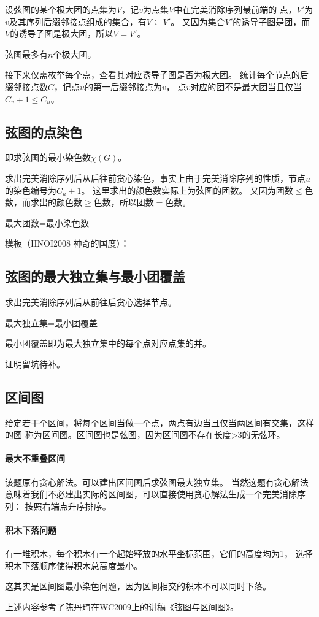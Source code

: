 设弦图的某个极大团的点集为$V$，记$v$为点集$V$中在完美消除序列最前端的
点，$V'$为$v$及其序列后缀邻接点组成的集合，有$V\subseteq V'$。
又因为集合$V'$的诱导子图是团，而$V$的诱导子图是极大团，所以$V=V'$。
\begin{inference}
    弦图最多有$n$个极大团。
\end{inference}

接下来仅需枚举每个点，查看其对应诱导子图是否为极大团。
统计每个节点的后缀邻接点数$C$，记点$u$的第一后缀邻接点为$v$，
点$v$对应的团不是最大团当且仅当$C_v+1\leq C_u$。
\subsection{弦图的点染色}
即求弦图的最小染色数$\chi(G)$。

求出完美消除序列后从后往前贪心染色，事实上由于完美消除序列的性质，节点$u$的染色编号为$C_u+1$。
这里求出的颜色数实际上为弦图的团数。
又因为团数$\leq$色数，而求出的颜色数$\geq$色数，所以团数$=$色数。
\begin{theorem}
    最大团数=最小染色数
\end{theorem}

模板（HNOI2008 神奇的国度）：

\subsection{弦图的最大独立集与最小团覆盖}
求出完美消除序列后从前往后贪心选择节点。

\begin{theorem}
    最大独立集=最小团覆盖
\end{theorem}

最小团覆盖即为最大独立集中的每个点对应点集的并。

证明留坑待补。
\subsection{区间图}
给定若干个区间，将每个区间当做一个点，两点有边当且仅当两区间有交集，这样的图
称为区间图。区间图也是弦图，因为区间图不存在长度>3的无弦环。

\paragraph{最大不重叠区间} 该题原有贪心解法。可以建出区间图后求弦图最大独立集。
当然这题有贪心解法意味着我们不必建出实际的区间图，可以直接使用贪心解法生成一个完美消除序列：
按照右端点升序排序。

\paragraph{积木下落问题}
有一堆积木，每个积木有一个起始释放的水平坐标范围，它们的高度均为1，
选择积木下落顺序使得积木总高度最小。

这其实是区间图最小染色问题，因为区间相交的积木不可以同时下落。

上述内容参考了陈丹琦在WC2009上的讲稿《弦图与区间图》\cite{chord}。
